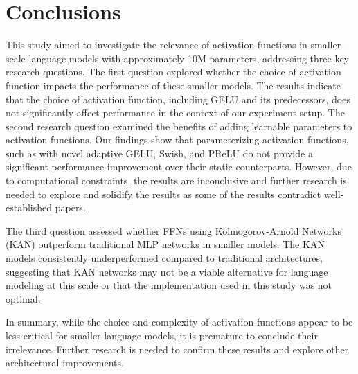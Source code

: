 \section{Conclusions} %
\label{sec:conclusion}
This study aimed to investigate the relevance of activation functions in smaller-scale language models with approximately 10M parameters, addressing three key research questions. The first question explored whether the choice of activation function impacts the performance of these smaller models. The results indicate that the choice of activation function, including GELU and its predecessors, does not significantly affect performance in the context of our experiment setup. The second research question examined the benefits of adding learnable parameters to activation functions. Our findings show that parameterizing activation functions, such as with novel adaptive GELU, Swish, and PReLU do not provide a significant performance improvement over their static counterparts. However, due to computational constraints, the results are inconclusive and further research is needed to explore and solidify the results as some of the results contradict well-established papers.
 
The third question assessed whether FFNs using Kolmogorov-Arnold Networks (KAN) outperform traditional MLP networks in smaller models. The KAN models consistently underperformed compared to traditional architectures, suggesting that KAN networks may not be a viable alternative for language modeling at this scale or that the implementation used in this study was not optimal.

In summary, while the choice and complexity of activation functions appear to be less critical for smaller language models, it is premature to conclude their irrelevance. Further research is needed to confirm these results and explore other architectural improvements.